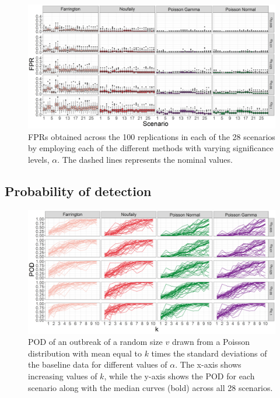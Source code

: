 \documentclass[preprint, 3p, authoryear]{elsarticle} %
\begin{document}
\begin{figure}[H]
\includegraphics[width=1\linewidth]{../../figures/FPR_alpha_methods} \caption{FPRs obtained across the 100 replications in each of the 28 scenarios by employing each of the different methods with varying significance levels, \(\alpha\). The dashed lines represents the nominal values.}\label{fig:FPRalphamethods}
\end{figure}

\hypertarget{probability-of-detection-1}{%
\subsection{Probability of detection}\label{probability-of-detection-1}}



\begin{figure}[H]
\includegraphics[width=1\linewidth]{../../figures/POD_alpha_methods} \caption{POD of an outbreak of a random size \(v\) drawn from a Poisson distribution with mean equal to \(k\) times the standard deviations of the baseline data for different values of \(\alpha\). The x-axis shows increasing values of \(k\), while the y-axis shows the POD for each scenario along with the median curves (bold) across all 28 scenarios.}\label{fig:PODalphamethods}
\end{figure}
\end{document}
